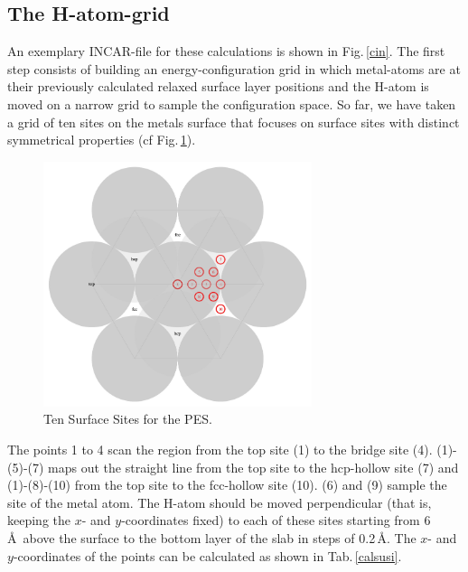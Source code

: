 \documentclass[twoside, 11pt, titlepage, captions=nooneline, a4paper, headsepline]{scrbook}%
\begin{document}
\subsection{The H-atom-grid}
An exemplary INCAR-file for these calculations is shown in Fig.\,\ref{cin}.
The first step consists of building an energy-configuration grid in which metal-atoms are at their previously calculated relaxed surface layer positions and the H-atom is moved on a narrow grid to sample the configuration space. So far, we have taken a grid of ten sites on the metals surface that focuses on surface sites with distinct symmetrical properties (cf Fig.\,\ref{surfacesites}).
\begin{figure}[t!]
\centering
\includegraphics[width=0.7\textwidth]{Figures/SurfaceSites}
\caption{Ten Surface Sites for the PES.}
\label{surfacesites}
\end{figure}
The points 1 to 4 scan the region from the top site (1) to the bridge site (4). (1)-(5)-(7) maps out the straight line from the top site to the hcp-hollow site (7) and (1)-(8)-(10) from the top site to the fcc-hollow site (10). (6) and (9) sample the site of the metal atom. The H-atom should be moved perpendicular (that is, keeping the $x$- and $y$-coordinates fixed) to each of these sites starting from 6\,\AA~above the surface to the bottom layer of the slab in steps of 0.2\,\AA. The $x$- and $y$-coordinates of the points can be calculated as shown in Tab.\,\ref{calsusi}.
\end{document}
